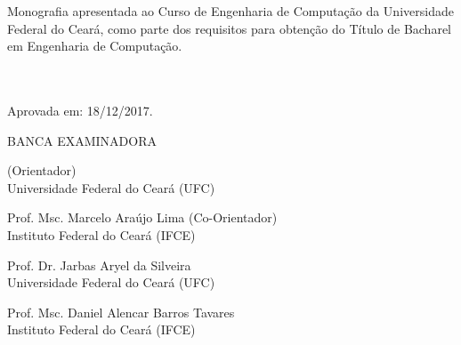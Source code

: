 \begin{folhadeaprovacao}
	
	\begin{center}
		{\MakeUppercase\imprimirautor}
		\vspace{1cm}
		
		\begin{center}
			\MakeUppercase\imprimirtitulo
		\end{center}
		
		\vspace{2cm}
		\hspace{.45\textwidth}
		\begin{minipage}{0.5\textwidth}
			Monografia apresentada ao Curso de Engenharia de Computação da Universidade Federal do Ceará, como parte dos requisitos para obtenção do Título de Bacharel em Engenharia de Computação.
			\\ \\ \\
		\end{minipage}
		
		\vspace{-0.5cm}
		
		\begin{minipage}{\textwidth}
			Aprovada em: 18/12/2017.
		\end{minipage}
		
		\vspace{0.5cm}
		BANCA EXAMINADORA
	\end{center}
	
	\def\spacebetweensigns{-12pt}
	
	\vspace{\spacebetweensigns}
	\assinatura{}
	\vspace{\spacebetweensigns}
	\begin{center}
		{\imprimirorientador \space (Orientador) \\ Universidade Federal do Ceará (UFC)}
	\end{center}
	
	
	\vspace{\spacebetweensigns}
	\assinatura{}
	\vspace{\spacebetweensigns}
	\begin{center}
		{Prof. Msc. Marcelo Araújo Lima  \space (Co-Orientador) \\ Instituto Federal do Ceará (IFCE)}
	\end{center}
	
	\vspace{\spacebetweensigns}
	\assinatura{}
	\vspace{\spacebetweensigns}
	\begin{center}
		{Prof. Dr. Jarbas Aryel da Silveira \\ Universidade Federal do Ceará (UFC)}
	\end{center}
	
	\vspace{\spacebetweensigns}
	\assinatura{}
	\vspace{\spacebetweensigns}
	\begin{center}
		{Prof. Msc. Daniel Alencar Barros Tavares \\ Instituto Federal do Ceará (IFCE)}
	\end{center}
		
\end{folhadeaprovacao}
